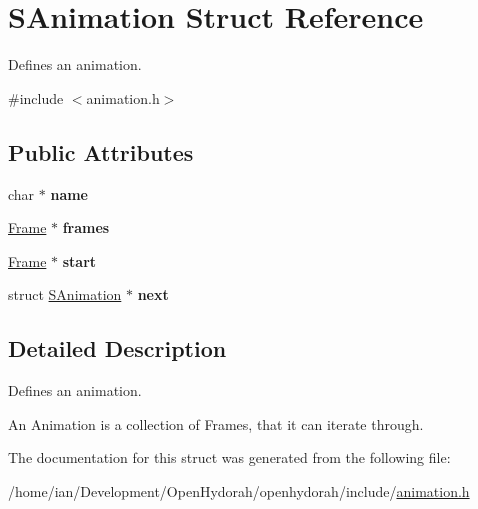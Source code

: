 \hypertarget{structSAnimation}{\section{S\-Animation Struct Reference}
\label{structSAnimation}
}


Defines an animation.  




{\ttfamily \#include $<$animation.\-h$>$}

\subsection*{Public Attributes}
\begin{DoxyCompactItemize}
\item 
\hypertarget{structSAnimation_af283fc98df38f93d4c676f69f5ebd908}{char $\ast$ {\bfseries name}}\label{structSAnimation_af283fc98df38f93d4c676f69f5ebd908}

\item 
\hypertarget{structSAnimation_a252ce515faed028c15d2c5799a87fb2f}{\hyperlink{structSFrame}{Frame} $\ast$ {\bfseries frames}}\label{structSAnimation_a252ce515faed028c15d2c5799a87fb2f}

\item 
\hypertarget{structSAnimation_a1372f0da5e79d2d7f99b0ee952208ec9}{\hyperlink{structSFrame}{Frame} $\ast$ {\bfseries start}}\label{structSAnimation_a1372f0da5e79d2d7f99b0ee952208ec9}

\item 
\hypertarget{structSAnimation_aba2ea3f1774d338dee873d8b04f757c5}{struct \hyperlink{structSAnimation}{S\-Animation} $\ast$ {\bfseries next}}\label{structSAnimation_aba2ea3f1774d338dee873d8b04f757c5}

\end{DoxyCompactItemize}


\subsection{Detailed Description}
Defines an animation. 

An Animation is a collection of Frames, that it can iterate through. 

The documentation for this struct was generated from the following file\-:\begin{DoxyCompactItemize}
\item 
/home/ian/\-Development/\-Open\-Hydorah/openhydorah/include/\hyperlink{animation_8h}{animation.\-h}\end{DoxyCompactItemize}
